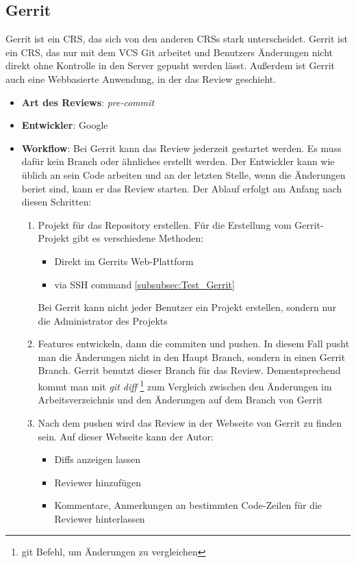 \subsection{Gerrit}
\label{subsec:Gerrit}

Gerrit ist ein \ac{CRS}, das sich von den anderen \acp{CRS} stark unterscheidet. Gerrit ist ein \ac{CRS}, das nur mit dem \ac{VCS} Git arbeitet und Benutzers Änderungen nicht direkt ohne Kontrolle in den Server gepusht werden lässt. Außerdem ist Gerrit auch eine Webbasierte Anwendung, in der das Review geschieht.

\begin{itemize}
	\item \textbf{Art des Reviews}: \textit{pre-commit}
	\item \textbf{Entwickler}: Google
	\item \textbf{Workflow}: Bei Gerrit kann das Review jederzeit gestartet werden. Es muss dafür kein Branch oder ähnliches erstellt werden. Der Entwickler kann wie üblich an sein Code arbeiten und an der letzten Stelle, wenn die Änderungen beriet sind, kann er das Review starten. Der Ablauf erfolgt am Anfang nach diesen Schritten:
	
		\begin{enumerate}
			\item Projekt für das Repository erstellen. Für die Erstellung vom Gerrit-Projekt gibt es verschiedene Methoden:
			
			\begin{itemize}
				\item Direkt im Gerrits Web-Plattform
				\item via \ac{SSH} command \cref{subsubsec:Test_Gerrit}
			\end{itemize}
			
			Bei Gerrit kann nicht jeder Benutzer ein Projekt erstellen, sondern nur die Administrator des Projekts		
			
			\item Features entwickeln, dann die commiten und pushen. In diesem Fall pusht man die Änderungen nicht in den Haupt Branch, sondern in einen Gerrit Branch.
				Gerrit benutzt dieser Branch für das Review. Dementsprechend kommt man mit \textit{git diff} \footnote{git Befehl, um Änderungen zu vergleichen} zum 							Vergleich zwischen den Änderungen im Arbeitsverzeichnis und den Änderungen auf dem Branch von Gerrit
				
			\item Nach dem pushen wird das Review in der Webseite von Gerrit zu finden sein. Auf dieser Webseite kann der Autor: 
			\begin{itemize}
				\item Diffs anzeigen lassen
				\item Reviewer hinzufügen
				\item Kommentare, Anmerkungen an bestimmten Code-Zeilen für die Reviewer hinterlassen
			\end{itemize}
			

\end{enumerate}
\end{itemize}
